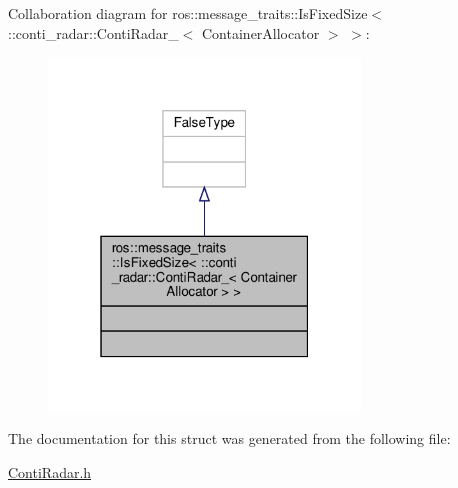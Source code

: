 Collaboration diagram for ros\+:\+:message\+\_\+traits\+:\+:Is\+Fixed\+Size$<$ \+:\+:conti\+\_\+radar\+:\+:Conti\+Radar\+\_\+$<$ Container\+Allocator $>$ $>$\+:\nopagebreak
\begin{figure}[H]
\begin{center}
\leavevmode
\includegraphics[width=235pt]{db/d43/structros_1_1message__traits_1_1IsFixedSize_3_01_1_1conti__radar_1_1ContiRadar___3_01ContainerAllocator_01_4_01_4__coll__graph}
\end{center}
\end{figure}


The documentation for this struct was generated from the following file\+:\begin{DoxyCompactItemize}
\item 
\hyperlink{ContiRadar_8h}{Conti\+Radar.\+h}\end{DoxyCompactItemize}
